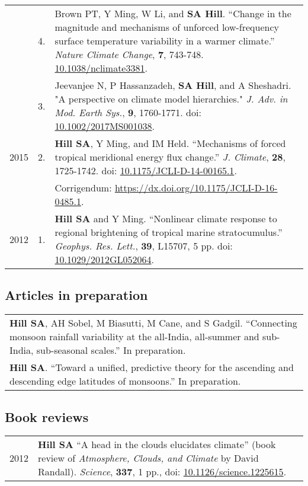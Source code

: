 \documentclass[letterpaper,11pt]{shillcv}
\begin{document}
\begin{longtable}{@{} Y{0.05\textwidth} >{\color{black}} p{0.04\textwidth} @{} L{0.91\textwidth} @{}}
     & 4. & Brown PT, Y Ming, W Li, and \textbf{SA Hill}.  ``Change
in the magnitude and mechanisms of unforced low-frequency surface temperature
variability in a warmer climate.''  \emph{Nature Climate Change}, \textbf{7}, 743-748.  \href{https://doi.org/10.1038/nclimate3381}{10.1038/nclimate3381}.\\
     & 3. & Jeevanjee N, P Hassanzadeh, \textbf{SA Hill}, and A Sheshadri.  "A perspective on climate model hierarchies."  \emph{J.  Adv. in Mod. Earth Sys.}, \textbf{9}, 1760-1771.  doi: \href{https://doi.org/10.1002/2017MS001038}{10.1002/2017MS001038}.\\
2015 & 2. & \textbf{Hill SA}, Y Ming, and IM Held.  ``Mechanisms of forced
tropical meridional energy flux change.''  \emph{J. Climate}, \textbf{28}, 1725-1742.  doi: \href{http://dx.doi.org/10.1175/JCLI-D-14-00165.1}{10.1175/JCLI-D-14-00165.1}.\\
& & \hspace{1cm} Corrigendum: \href{https://dx.doi.org/10.1175/JCLI-D-16-0485.1}{https://dx.doi.org/10.1175/JCLI-D-16-0485.1}.\\
2012 & 1. & \textbf{Hill SA} and Y Ming.  ``Nonlinear climate response to regional
brightening of tropical marine stratocumulus.''  \emph{Geophys. Res. Lett.},
\textbf{39}, L15707, 5 pp.  doi: \href{http://dx.doi.org/10.1029/2012GL052064}{10.1029/2012GL052064}.\\
\end{longtable}


\subsection*{Articles in preparation}
\begin{longtable}{@{} L{\textwidth} @{}}

\textbf{Hill SA}, AH Sobel, M Biasutti, M Cane, and S Gadgil.  ``Connecting monsoon rainfall variability at the all-India, all-summer and sub-India, sub-seasonal scales.''  In preparation.\\
\textbf{Hill SA}.  ``Toward a unified, predictive theory for the ascending and descending edge latitudes of monsoons.''   In preparation.\\

\end{longtable}

\subsection*{Book reviews}
\begin{longtable}{@{}  Y{0.05\textwidth} L{0.95\textwidth} @{}}
2012 & \textbf{Hill SA}  ``A head in the clouds elucidates climate'' (book
review of \emph{Atmosphere, Clouds, and Climate} by David Randall).  \emph{Science}, \textbf{337},
1 pp., doi: \href{http://dx.doi.org/10.1126/science.1225615}{10.1126/science.1225615}.\\
\end{longtable}
\end{document}
